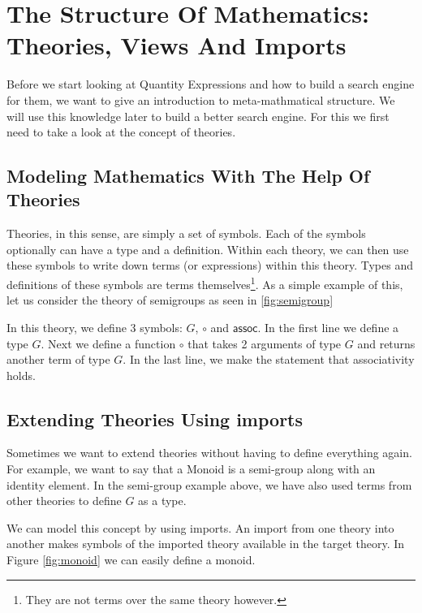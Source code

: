 \section{The Structure Of Mathematics: Theories, Views And Imports}
\label{sec:mathoverview}

Before we start looking at Quantity Expressions and how to build a search engine for them, we want to give an introduction to meta-mathmatical structure. We will use this knowledge later to build a better search engine. For this we first need to take a look at the concept of theories.

\subsection{Modeling Mathematics With The Help Of Theories}

Theories, in this sense, are simply a set of symbols. Each of the symbols optionally can have a type and a definition. Within each theory, we can then use these symbols to write down terms (or expressions) within this theory. Types and definitions of these symbols are terms themselves\footnote{They are not terms over the same theory however. }. As a simple example of this, let us consider the theory of semigroups as seen in \ref{fig:semigroup}



In this theory, we define 3 symbols: $G$, $\circ$ and $\scriptstyle \mathsf{assoc}$. In the first line we define a type $G$. Next we define a function $\circ$ that takes 2 arguments of type $G$ and returns another term of type $G$. In the last line, we make the statement that associativity holds.

\subsection{Extending Theories Using imports}

Sometimes we want to extend theories without having to define everything again. For example, we want to say that a Monoid is a semi-group along with an identity element. In the semi-group example above, we have also used terms from other theories to define $G$ as a type.

We can model this concept by using imports. An import from one theory into another makes symbols of the imported theory available in the target theory. In Figure \ref{fig:monoid} we can easily define a monoid.

